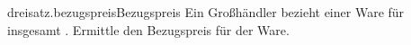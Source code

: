 \begin{exercise}{dreisatz.bezugspreis}{Bezugspreis}
  \ifproblem\problem
    Ein Großhändler bezieht  einer Ware für insgesamt .
    Ermittle den Bezugspreis für  der Ware.
  \fi
\end{exercise}
